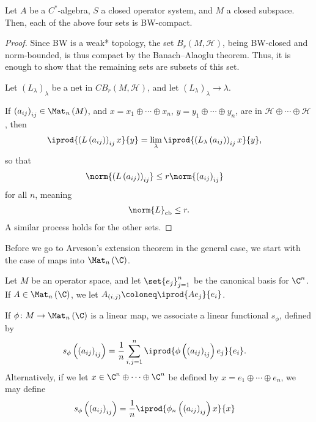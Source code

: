 \documentclass[10pt]{mypackage}
\DeclareMathOperator{\cb}{cb}
\begin{document}
\begin{theorem}
  Let $A$ be a $C^{\ast}$-algebra, $S$ a closed operator system, and $M$ a closed subspace. Then, each of the above four sets is BW-compact.
\end{theorem}
\begin{proof}
  Since BW is a weak* topology, the set $B_r\left( M,\mathcal{H} \right)$, being BW-closed and norm-bounded, is thus compact by the Banach--Alaoglu theorem. Thus, it is enough to show that the remaining sets are subsets of this set.\newline

  Let $\left( L_{\lambda} \right)_{\lambda}$ be a net in $CB_r\left( M,\mathcal{H} \right)$, and let $\left( L_{\lambda} \right)_{\lambda}\rightarrow \lambda$.\newline

  If $\left( a_{ij} \right)_{ij}\in \Mat_n\left( M \right)$, and $x = x_1\oplus\cdots\oplus x_n$, $y = y_1\oplus\cdots\oplus y_n$, are in $\mathcal{H}\oplus\cdots\oplus \mathcal{H}$, then
  \begin{align*}
    \iprod{\left( L\left( a_{ij} \right) \right)_{ij}x}{y} &= \lim_{\lambda} \iprod{\left( L_{\lambda}\left( a_{ij} \right) \right)_{ij}x}{y},
  \end{align*}
  so that
  \begin{align*}
    \norm{\left( L\left( a_{ij} \right) \right)_{ij}} &\leq r\norm{\left( a_{ij} \right)_{ij}}
  \end{align*}
  for all $n$, meaning
  \begin{align*}
    \norm{L}_{\cb}\leq r.
  \end{align*}
  A similar process holds for the other sets.
\end{proof}
Before we go to Arveson's extension theorem in the general case, we start with the case of maps into $\Mat_n\left( \C \right)$.
\begin{definition}
  Let $M$ be an operator space, and let $\set{e_{j}}_{j=1}^{n}$ be the canonical basis for $\C^n$. If $A\in \Mat_n\left( \C \right)$, we let $A_{\left( i,j \right)} \coloneq \iprod{Ae_j}{e_i}$.\newline

  If $\phi\colon M\rightarrow \Mat_n\left( \C \right)$ is a linear map, we associate a linear functional $s_{\phi}$, defined by
  \begin{align*}
    s_{\phi}\left( \left( a_{ij} \right)_{ij} \right) &= \frac{1}{n}\sum_{i,j=1}^{n} \iprod{\phi\left( \left( a_{ij} \right)_{ij} \right)e_j}{e_i}.
  \end{align*}
  Alternatively, if we let $x\in \C^n\oplus\cdots\oplus \C^n$ be defined by $x = e_1\oplus\cdots\oplus e_n$, we may define
  \begin{align*}
    s_{\phi}\left( \left( a_{ij} \right)_{ij} \right) &= \frac{1}{n} \iprod{\phi_n\left( \left( a_{ij} \right)_{ij} \right)x}{x}
  \end{align*}
\end{definition}
\end{document}
